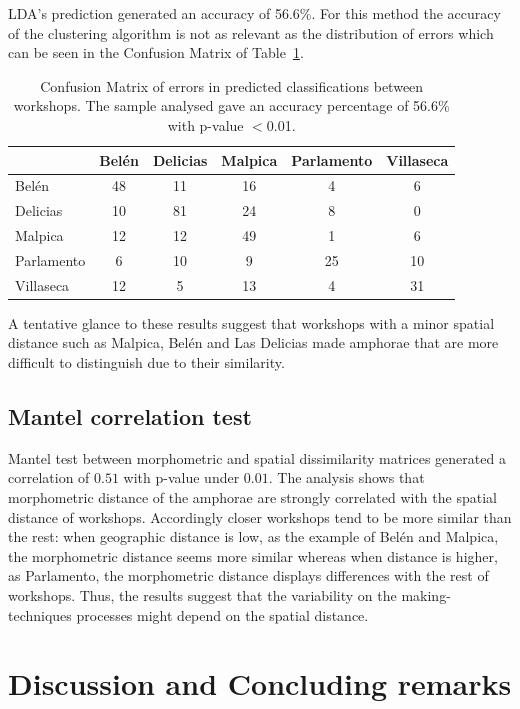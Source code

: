 \documentclass[review]{elsarticle}
\begin{document}
LDA's prediction generated an accuracy of 56.6\%. For this method the accuracy of the clustering algorithm is not as relevant as the distribution of errors which can be seen in the Confusion Matrix of Table~\ref{table:confusion}.

\begin{table}[htp]
\begin{tabular}{lccccc}
\hline
      & Belén & Delicias & Malpica & Parlamento & Villaseca\\ \hline
Belén & 48 & 11 & 16 & 4 & 6 \\
Delicias & 10 & 81 & 24 & 8 & 0 \\
Malpica & 12 & 12 & 49 & 1 & 6 \\
Parlamento & 6 & 10 & 9 & 25 & 10 \\
Villaseca & 12 & 5 & 13 & 4 & 31 \\
\hline

\end{tabular}
\caption{Confusion Matrix of errors in predicted classifications between workshops. The sample analysed gave an accuracy percentage of 56.6\% with p-value $<$0.01. }
\label{table:confusion}
\end{table}

A tentative glance to these results suggest that workshops with a minor spatial distance such as Malpica, Belén and Las Delicias made amphorae that are more difficult to distinguish due to their similarity. 

\subsection{Mantel correlation test}

Mantel test between morphometric and spatial dissimilarity matrices generated a correlation of $0.51$ with p-value under $0.01$. The analysis shows that morphometric distance of the amphorae are strongly correlated with the spatial distance of workshops. Accordingly closer workshops tend to be more similar than the rest: when geographic distance is low, as the example of Belén and Malpica, the morphometric distance seems more similar whereas when distance is higher, as Parlamento, the morphometric distance displays differences with the rest of workshops. Thus, the results suggest that the variability on the making-techniques processes might depend on the spatial distance.   

\section{Discussion and Concluding remarks}
\end{document}
